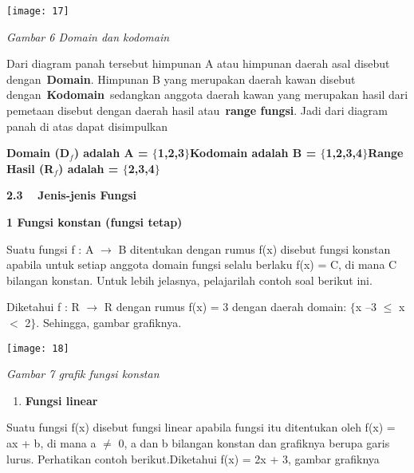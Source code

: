 \documentclass[11pt,fleqn]{book} %
\begin{document}
\begin{myEnumerate}
\begin{itemize}
\begin{center}
\noindent \texttt{[image: 17]}
\end{center}

\noindent \textit{Gambar 6 Domain dan kodomain}

\noindent 

\noindent Dari diagram panah tersebut himpunan A atau himpunan daerah asal disebut dengan~\textbf{Domain}. Himpunan B yang merupakan daerah kawan disebut dengan~\textbf{Kodomain}~sedangkan anggota daerah kawan yang merupakan hasil dari pemetaan disebut dengan daerah hasil atau~\textbf{range fungsi}. Jadi dari diagram panah di atas dapat disimpulkan

\noindent 

\noindent \textbf{Domain (D${}_{f}$) adalah A = $\boldsymbol{\{}$1,2,3$\boldsymbol{\}}$Kodomain adalah B = $\boldsymbol{\{}$1,2,3,4$\boldsymbol{\}}$Range Hasil (R${}_{f}$) adalah = $\boldsymbol{\{}$2,3,4$\boldsymbol{\}}$}

\noindent 

\noindent \textbf{2.3 }~~\textbf{Jenis-jenis Fungsi}

\textbf{}

\textbf{1  Fungsi konstan (fungsi tetap)}

\textbf{}

Suatu fungsi f : A $\mathrm{\to}$ B ditentukan dengan rumus f(x) disebut fungsi konstan apabila untuk setiap anggota domain fungsi selalu berlaku f(x) = C, di mana C bilangan konstan. Untuk lebih jelasnya, pelajarilah contoh soal berikut ini.



\noindent Diketahui f : R $\mathrm{\to}$ R dengan rumus f(x) = 3 dengan daerah domain: $\{$x {\textbar} --3 $\mathrm{\le}$ x $<$ 2$\}$. Sehingga, gambar grafiknya.

\begin{center}
\noindent \texttt{[image: 18]}
\end{center}

\textit{Gambar 7 grafik fungsi konstan}

\textit{}

\begin{enumerate}
\item \textit{ }\textbf{\textit{ }Fungsi linear\textit{}}
\end{enumerate}

\noindent Suatu fungsi f(x) disebut fungsi linear apabila fungsi itu ditentukan oleh f(x) = ax + b, di mana a $\mathrm{\neq}$ 0, a dan b bilangan konstan dan grafiknya berupa garis lurus. Perhatikan contoh berikut.Diketahui f(x) = 2x + 3, gambar grafiknya\textit{}


\end{itemize}
\end{myEnumerate}
\end{document}
